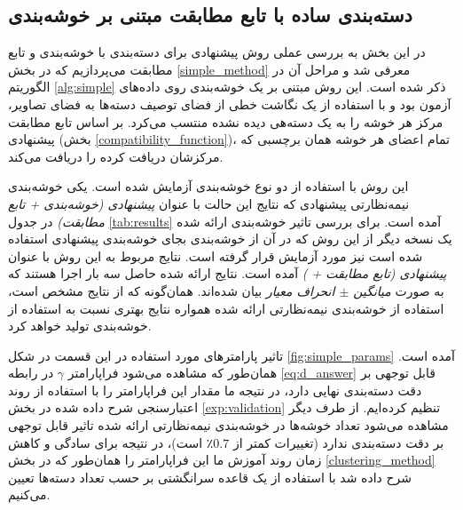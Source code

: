 \subsection{دسته‌بندی ساده با تابع مطابقت مبتنی بر خوشه‌بندی} \label{exp:simple}
در این بخش به بررسی عملی روش پیشنهادی برای دسته‌بندی با خوشه‌بندی و تابع مطابقت می‌پردازیم که  در بخش \ref{simple_method} معرفی شد و مراحل آن در الگوریتم \ref{alg:simple} ذکر شده است. این روش مبتنی بر یک خوشه‌بندی روی داده‌های آزمون بود و با استفاده از یک نگاشت خطی از فضای توصیف دسته‌ها به فضای تصاویر، مرکز هر خوشه را به یک دسته‌هی دیده نشده منتسب می‌کرد. بر اساس تابع مطابقت پیشنهادی (بخش \ref{compatibility_function})، تمام اعضای هر خوشه همان برچسبی که مرکزشان دریافت کرده را دریافت می‌کند.

این روش با استفاده از دو نوع خوشه‌بندی آزمایش شده است. یکی خوشه‌بندی نیمه‌نظارتی پیشنهادی که نتایج این حالت با عنوان
\textit{پیشنهادی (خوشه‌بندی + تابع مطابقت) }
در جدول \ref{tab:results} آمده است.
 برای بررسی تاثیر خوشه‌بندی ارائه شده یک نسخه دیگر از این روش که در آن از خوشه‌بندی  بجای خوشه‌بندی پیشنهادی استفاده شده است نیز مورد آزمایش قرار گرفته است. نتایج مربوط به این روش با عنوان
\textit{ پیشنهادی (تابع مطابقت +  ) }
آمده است. نتایج ارائه شده حاصل سه بار اجرا هستند که به صورت
\textit{ میانگین $\pm$ انحراف معیار }
بیان شده‌اند. همان‌گونه که از نتایج مشخص است، استفاده از خوشه‌بندی نیمه‌نظارتی ارائه شده همواره نتایج بهتری نسبت به استفاده از خوشه‌بندی   تولید خواهد کرد.

 تاثیر پارامترهای مورد استفاده در این قسمت در شکل \ref{fig:simple_params} آمده است. همان‌طور که مشاهده می‌شود فراپارامتر $\gamma$ در رابطه
 \eqref{eq:d_answer}
 قابل توجهی بر دقت دسته‌بندی نهایی دارد، در نتیجه ما مقدار این فراپارامتر را با استفاده از روند اعتبارسنجی شرح داده شده در بخش \ref{exp:validation} تنظیم کرده‌ایم. از طرف دیگر مشاهده می‌شود تعداد خوشه‌ها در خوشه‌بندی نیمه‌نظارتی ارائه شده تاثیر قابل توجهی بر دقت دسته‌بندی ندارد (تغییرات کمتر از $0.7$٪ است)، در نتیجه برای سادگی و کاهش زمان روند آموزش ما این فراپارامتر را همان‌طور که در بخش
 \ref{clustering_method}
 شرح داده شد با استفاده از یک قاعده سرانگشتی بر حسب تعداد دسته‌ها تعیین می‌کنیم.

